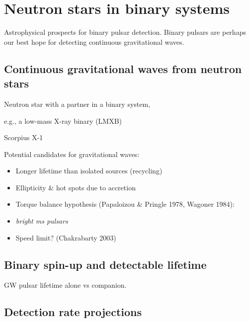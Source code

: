 


        
        \section{Neutron stars in binary systems}
        \label{binary_NS}

            Astrophysical prospects for binary pulsar detection. 
            Binary pulsars are perhaps our best hope for detecting continuous gravitational waves.

\subsection{Continuous gravitational waves from neutron stars}

\begin{definition}
Neutron star with a partner in a binary system, 

e.g., a low-mass X-ray binary (LMXB)\end{definition}
\begin{example}
Scorpius X-1
\end{example}

Potential candidates for gravitational waves:
\begin{itemize}
\item Longer lifetime than isolated sources (recycling)
\item Ellipticity \& hot spots due to accretion
\item Torque balance hypothesis (Papaloizou \& Pringle 1978, Wagoner 1984):
\item \emph{bright ms pulsars}
\item Speed limit? (Chakrabarty 2003)
\end{itemize}




            \subsection{Binary spin-up and detectable lifetime}
            \label{spin-up}
         
                GW pulsar lifetime alone vs companion.

            \subsection{Detection rate projections}
            \label{rate_projections}

